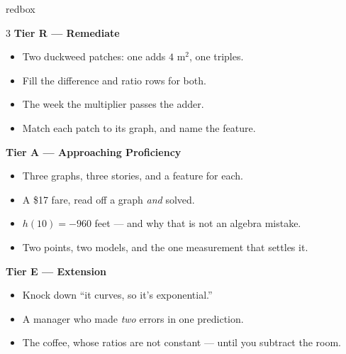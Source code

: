 \documentclass[10pt]{article}
\begin{document}
\boxguard
\begin{skillbox}{redbox}
\begin{multicols}{3}
\textbf{Tier R --- Remediate}
\begin{itemize}[leftmargin=1em, itemsep=1pt, topsep=2pt]
  \item Two duckweed patches: one adds $4$ m$^2$, one triples.
  \item Fill the difference and ratio rows for both.
  \item The week the multiplier passes the adder.
  \item Match each patch to its graph, and name the feature.
\end{itemize}

\columnbreak
\textbf{Tier A --- Approaching Proficiency}
\begin{itemize}[leftmargin=1em, itemsep=1pt, topsep=2pt]
  \item Three graphs, three stories, and a feature for each.
  \item A \$17 fare, read off a graph \emph{and} solved.
  \item $h(10)=-960$ feet --- and why that is not an algebra mistake.
  \item Two points, two models, and the one measurement that settles it.
\end{itemize}

\columnbreak
\textbf{Tier E --- Extension}
\begin{itemize}[leftmargin=1em, itemsep=1pt, topsep=2pt]
  \item Knock down ``it curves, so it's exponential.''
  \item A manager who made \emph{two} errors in one prediction.
  \item The coffee, whose ratios are not constant --- until you subtract the room.
\end{itemize}
\end{multicols}
\end{skillbox}
\end{document}
